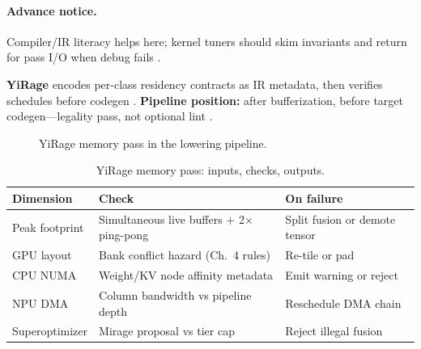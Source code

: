\paragraph{Advance notice.}
Compiler/IR literacy helps here; kernel tuners should skim invariants and return for pass I/O when debug fails \citep{chen2020compilerbasedhardw,yirage2026}.

\textbf{YiRage} encodes per-class residency contracts as IR metadata, then verifies schedules before codegen \citep{yirage2026}.
\textbf{Pipeline position:} after bufferization, before target codegen---legality pass, not optional lint \citep{rotem2018glow,wu2024mirage}.

\begin{figure}[t]
\centering
{}
\caption{YiRage memory pass in the lowering pipeline.}
\label{fig:ch06_yirage_memory_pass}
\end{figure}

\begin{table}[t]
\centering
\small
\caption{YiRage memory pass: inputs, checks, outputs.}
\label{tab:ch06_memory_pass_io}
\begin{tabular}{@{}p{2.2cm}p{4.2cm}p{3.6cm}@{}}
\toprule
\textbf{Dimension} & \textbf{Check} & \textbf{On failure} \\
\midrule
Peak footprint & Simultaneous live buffers + 2$\times$ ping-pong & Split fusion or demote tensor \\
GPU layout & Bank conflict hazard (Ch.~4 rules) & Re-tile or pad \\
CPU NUMA & Weight/KV node affinity metadata & Emit warning or reject \\
NPU DMA & Column bandwidth vs pipeline depth & Reschedule DMA chain \\
Superoptimizer & Mirage proposal vs tier cap & Reject illegal fusion \citep{wu2024mirage} \\
\bottomrule
\end{tabular}
\end{table}

